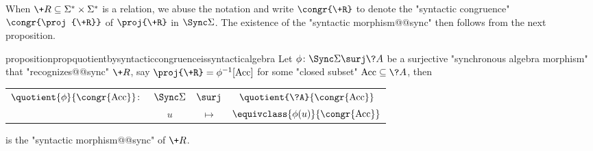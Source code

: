When $\+R \subseteq \Sigma^* \times\Sigma^*$ is a relation, we abuse
the notation and write $\congr{\+R}$ to denote
the "syntactic congruence" $\congr{\proj{\+R}}$ of $\proj{\+R}$
in $\Sync\Sigma$.
The existence of the "syntactic morphism@@sync" then follows from
the next proposition.

\begin{restatable}{proposition}{propquotientbysyntacticcongruenceissyntacticalgebra}
	\AP\label{prop:quotient-by-syntactic-congruence-is-syntactic-algebra}
	Let $\phi\colon \Sync\Sigma \surj \?A$ be a surjective "synchronous algebra morphism"
	that "recognizes@@sync" $\+R$, say $\proj{\+R} = \phi^{-1}[\Acc]$
	for some "closed subset" $\Acc \subseteq \?A$, then 
	\begin{center}
		\begin{tabular}{rccc}
			$\quotient{\phi}{\congr{\Acc}}\colon$
			& $\Sync\Sigma$
			& $\surj$
			& $\quotient{\?A}{\congr{\Acc}}$\\
			& $u$
			& $\mapsto$
			& $\equivclass{\phi(u)}{\congr{\Acc}}$
		\end{tabular}		
	\end{center}
	is the "syntactic morphism@@sync" of $\+R$.
\end{restatable}

